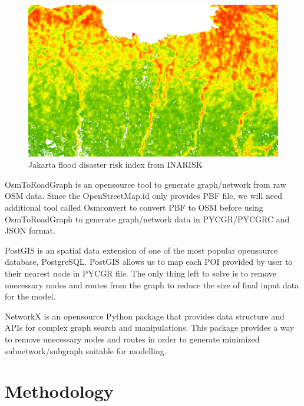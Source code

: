 \documentclass[conference]{IEEEtran}
\begin{document}
\begin{figure}
\centerline{\includegraphics[scale=0.35]{jakarta_flood_risk_layer_inarisk.png}}
\caption{Jakarta flood disaster risk index from INARISK}
\label{fig_jakarta_flood_risk_layer_inarisk}
\end{figure}

OsmToRoadGraph\cite{Gemsa2017OsmToRoadGraph} is an opensource tool to generate graph/network from raw OSM data. Since the OpenStreetMap.id only provides PBF file, we will need additional tool called Osmconvert\cite{OpenStreetMap2019OsmConvert} to convert PBF to OSM before using OsmToRoadGraph to generate graph/network data in PYCGR/PYCGRC and JSON format.

PostGIS\cite{postgis2019postgis} is an spatial data extension of one of the most popular opensource database, PostgreSQL\cite{postgresql1996postgresql}. PostGIS allows us to map each POI provided by user to their nearest node in PYCGR file. The only thing left to solve is to remove unecessary nodes and routes from the graph to reduce the size of final input data for the model.

NetworkX\cite{SciPyProceedings_11} is an opensource Python package that provides data structure and APIs for complex graph search and manipulations. This package provides a way to remove unecessary nodes and routes in order to generate minimized subnetwork/subgraph suitable for modelling.


\section{Methodology}
\end{document}
